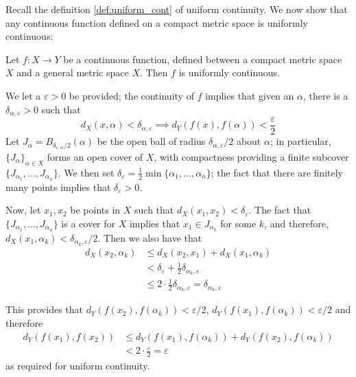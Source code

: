 Recall the definition \ref{def:uniform_cont} of uniform continuity. We now show that any continuous function defined on a compact metric space is uniformly continuous:
\begin{btheorem}{}{}
Let $f: X \to Y$ be a continuous function, defined between a compact metric space $X$ and a general metric space $X$. Then $f$ is uniformly continuous.
\end{btheorem}

\begin{bproof}{}{}
We let a $\varepsilon>0$ be provided; the continuity of $f$ implies that given an $\alpha$, there is a $\delta_{\alpha, \varepsilon}>0$ such that \[d_{X}(x,\alpha) < \delta_{\alpha,\varepsilon} \implies d_{Y}( f(x), f(\alpha) ) < \frac{\varepsilon}{2} \]
Let $J_{\alpha} = B_{\delta_{\varepsilon, \alpha}/2}(\alpha)$ be the open ball of radius $\delta_{\alpha,\varepsilon}/2$ about $\alpha$; in particular, $\{J_{\alpha}\}_{\alpha\in X}$ forms an open cover of $X$, with compactness providing a finite subcover \mbox{$\{ J_{\alpha_{1}},\ldots, J_{\alpha_{n}} \}$.} We then set \mbox{$\delta_{\varepsilon} = \frac{1}{2}\min\{\alpha_{1},\ldots, \alpha_{n} \}$;} the fact that there are finitely many points implies that $\delta_{\varepsilon}>0$.

Now, let $x_{1},x_{2}$ be points in $X$ such that \mbox{$d_{X}(x_{1},x_{2}) < \delta_{\varepsilon}$.} The fact that \mbox{$\{ J_{\alpha_{1}},\ldots, J_{\alpha_{n}} \}$} is a cover for $X$ implies that $x_{1}\in J_{\alpha_{k}}$ for some $k$, and therefore, \mbox{$d_{X}(x_{1},\alpha_{k}) < \delta_{\alpha_{k},\varepsilon}/2$.} Then we also have that 
\begin{equation}
    \begin{split}
        d_{X}(x_{2},\alpha_{k}) &\leq d_{X}(x_{2}, x_{1}) + d_{X}(x_{1},\alpha_{k}) \\
         &< \delta_{\varepsilon} +  \frac{1}{2} \delta_{\alpha_{k},\varepsilon} \\
         &\leq 2\cdot \frac{1}{2} \delta_{\alpha_{k},\varepsilon} = \delta_{\alpha_{k},\varepsilon}
    \end{split}
\end{equation}

This provides that $d_{Y}( f(x_{2}), f(\alpha_{k}) ) < \varepsilon/2$, $d_{Y}( f(x_{1}), f(\alpha_{k}) ) < \varepsilon/2$ and therefore
\begin{equation}
    \begin{split}
        d_{Y}( f(x_{1}), f(x_{2}) ) &\leq d_{Y}( f(x_{1}), f(\alpha_{k}) ) + d_{Y}( f(x_{2}), f(\alpha_{k}) ) \\
         & < 2\cdot \frac{\varepsilon}{2} = \varepsilon
\end{split}
\end{equation}
as required for uniform continuity.
\eop
\end{bproof}
